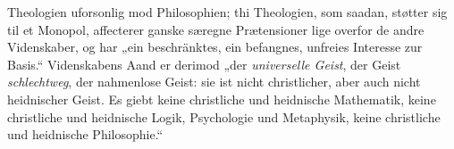 \documentclass[12pt]{book}
\newcommand{\opage}[1]{\marginnote{\footnotesize\textit{[#1]}}}
\begin{document}
Theologien uforsonlig mod Philosophien; thi Theologien, som saadan, støtter sig til et
Monopol, affecterer ganske særegne Prætensioner lige overfor de andre Videnskaber, og har
„ein beschränktes, ein befangnes, unfreies Interesse zur Basis.“ Videnskabens Aand er
derimod „der \emph{universelle Geist}, der Geist \emph{schlechtweg}, der nahmenlose
Geist: sie ist nicht christlicher, aber auch nicht heidnischer Geist. Es giebt keine
christliche und
\opage{264} %
heidnische Mathematik, keine christliche und heidnische Logik, Psychologie und
Metaphysik, keine christliche und heidnische Philosophie.“
\end{document}
